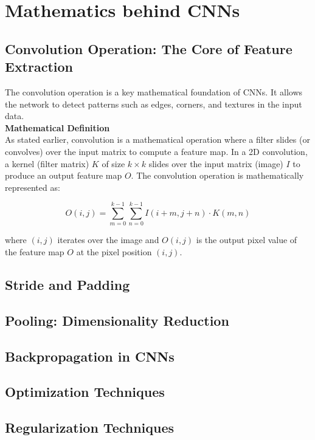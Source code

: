 \chapter{Mathematics behind CNNs}\label{chp:4}
\section{Convolution Operation: The Core of Feature Extraction}
The convolution operation is a key mathematical foundation of CNNs. It allows the network to detect patterns such as edges, corners, and textures in the input data.\\

\textbf{Mathematical Definition}\\

As stated earlier, convolution is a mathematical operation where a filter slides (or convolves) over the input matrix to compute a feature map. In a 2D convolution, a kernel (filter matrix) $K$ of size $k \times k$ slides over the input matrix (image) $I$ to produce an output feature map $O$. The convolution operation is mathematically represented as:

\begin{equation}
    O(i,j) = \sum_{m=0}^{k-1}\sum_{n=0}^{k-1}I(i+m,j+n) \cdot K(m,n)
\end{equation}

where $(i,j)$ iterates over the image and $O(i,j)$ is the output pixel value of the feature map $O$ at the pixel position $(i,j)$.


\section{Stride and Padding}


\section{Pooling: Dimensionality Reduction}


\section{Backpropagation in CNNs}


\section{Optimization Techniques}


\section{Regularization Techniques}
